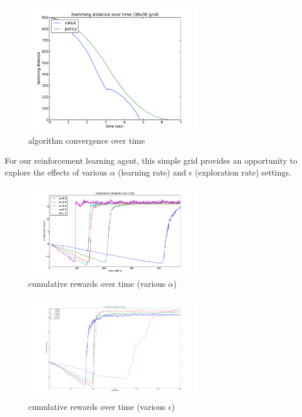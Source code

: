 \documentclass{sig-alternate}
\begin{document}
\begin{figure}[!htbp]
    \centering
    \includegraphics[width=3in]{images/simple/hd.pdf}
    \caption{algorithm convergence over time \label{simple-hd}}
\end{figure} 

For our reinforcement learning agent, this simple grid provides an opportunity to explore the effects of various $\alpha$ (learning rate) and $\epsilon$ (exploration rate) settings.

\begin{figure}[!htbp]
    \centering
    \includegraphics[width=3in]{images/simple/q-alpha.pdf}
    \caption{cumulative rewards over time (various $\alpha$) \label{simple-q-alpha}}
\end{figure} 

\begin{figure}[!htbp]
    \centering
    \includegraphics[width=3in]{images/simple/q-epsilon.pdf}
    \caption{cumulative rewards over time (various $\epsilon$) \label{simple-q-epsilon}}
\end{figure} 
\end{document}
